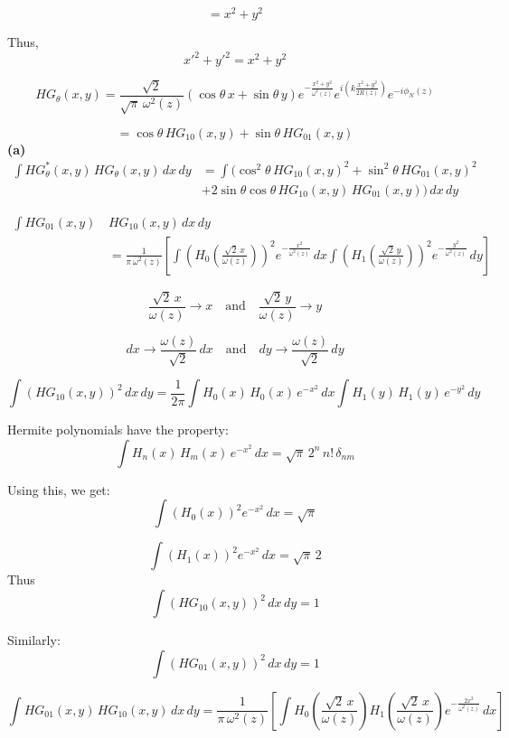 \documentclass{article}
\begin{document}
\[
= x^2 + y^2
\]

Thus, 
\[
x'^2 + y'^2 = x^2 + y^2
\]

\[
HG_{\theta}(x,y) = \frac{\sqrt{2}}{\sqrt{\pi} \, \omega^2(z)} \left( \cos \theta \, x + \sin \theta \, y \right) 
e^{-\frac{x^2 + y^2}{\omega^2(z)}} e^{i \left( k \frac{x^2 + y^2}{2 R(z)} \right)} e^{-i \phi_N(z)}
\]

\[
= \cos \theta \, HG_{10}(x, y) + \sin \theta \, HG_{01}(x, y)
\]
\textbf{(a)}
\begin{align*}
\int HG_{\theta}^*(x, y) \, HG_{\theta}(x, y) \, dx \, dy &= 
\int \Big( \cos^2 \theta \, HG_{10}(x, y)^2 + \sin^2 \theta \, HG_{01}(x, y)^2 \\
&+ 2 \sin \theta \cos \theta \, HG_{10}(x, y) \, HG_{01}(x, y) \Big) \, dx \, dy
\end{align*}

\begin{align*}
\int HG_{01}(x, y) \,& HG_{10}(x, y) \, dx \, dy \\
&= \frac{1}{\pi \, \omega^2(z)} 
\left[ \int \left( H_0 \left( \frac{\sqrt{2} \, x}{\omega(z)} \right) \right)^2 
e^{- \frac{x^2}{\omega^2(z)}} \, dx \int \left( H_1 \left( \frac{\sqrt{2} \, y}{\omega(z)} \right) \right)^2 
e^{- \frac{y^2}{\omega^2(z)}} \, dy \right]
\end{align*}

\[
\frac{\sqrt{2} \, x}{\omega(z)} \rightarrow x \quad \text{and} \quad 
\frac{\sqrt{2} \, y}{\omega(z)} \rightarrow y
\]

\[
dx \rightarrow \frac{\omega(z)}{\sqrt{2}} \, dx \quad \text{and} \quad 
dy \rightarrow \frac{\omega(z)}{\sqrt{2}} \, dy
\]

\[
\int \left( HG_{10}(x, y) \right)^2 \, dx \, dy = \frac{1}{2 \pi} 
\int H_0(x) \, H_0(x) \, e^{-x^2} \, dx \int H_1(y) \, H_1(y) \, e^{-y^2} \, dy
\]

Hermite polynomials have the property:
\[
\int H_n(x) \, H_m(x) \, e^{-x^2} \, dx = \sqrt{\pi} \, 2^n \, n! \, \delta_{n m}
\]

Using this, we get:
\[
\int \left( H_0(x) \right)^2 e^{-x^2} \, dx = \sqrt{\pi}
\]

\[
\int \left( H_1(x) \right)^2 e^{-x^2} \, dx = \sqrt{\pi} \, 2
\]
Thus
\[
\int \left( HG_{10}(x, y) \right)^2 \, dx \, dy = 1
\]

Similarly:
\[
\int \left( HG_{01}(x, y) \right)^2 \, dx \, dy = 1
\]

\[
\int HG_{01}(x, y) \, HG_{10}(x, y) \, dx \, dy = \frac{1}{\pi \, \omega^2(z)} 
\left[ \int H_0 \left( \frac{\sqrt{2} \, x}{\omega(z)} \right) 
H_1 \left( \frac{\sqrt{2} \, x}{\omega(z)} \right) 
e^{- \frac{2 x^2}{\omega^2(z)}} \, dx \right]
\]
\end{document}

